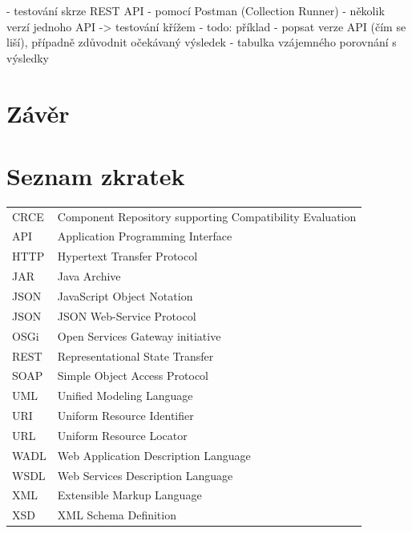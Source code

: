 \documentclass[czech,DP]{thesiskiv}
\newcommand\nomenclature[2]{#1 & #2 \\}
\begin{document}
- testování skrze REST API
- pomocí Postman (Collection Runner)
- několik verzí jednoho API -> testování křížem
- todo: příklad
	- popsat verze API (čím se liší), případně zdůvodnit očekávaný výsledek
	- tabulka vzájemného porovnání s výsledky

\chapter{Závěr}	

 
% 
%

{\raggedright\small

}

\chapter*{Seznam zkratek}

\begin{longtable}{@{}p{3cm}@{}p{\dimexpr\textwidth-1cm\relax}@{}}
	\nomenclature{CRCE}{Component Repository supporting Compatibility Evaluation}
	\nomenclature{API}{Application Programming Interface}
	\nomenclature{HTTP}{Hypertext Transfer Protocol}
	\nomenclature{JAR}{Java Archive}
	\nomenclature{JSON}{JavaScript Object Notation}
	\nomenclature{JSON}{JSON Web-Service Protocol}
	\nomenclature{OSGi}{Open Services Gateway initiative}
	\nomenclature{REST}{Representational State Transfer}
	\nomenclature{SOAP}{Simple Object Access Protocol}
	\nomenclature{UML}{Unified Modeling Language}
	\nomenclature{URI}{Uniform Resource Identifier}
	\nomenclature{URL}{Uniform Resource Locator}
	\nomenclature{WADL}{Web Application Description Language}
	\nomenclature{WSDL}{Web Services Description Language}
	\nomenclature{XML}{Extensible Markup Language}
	\nomenclature{XSD}{XML Schema Definition}
\end{longtable}
\end{document}
